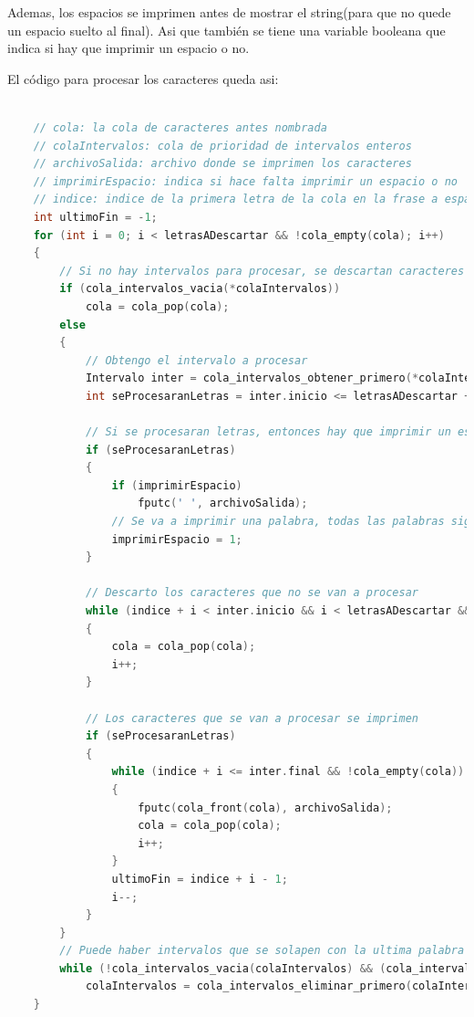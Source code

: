 \documentclass{article}
\begin{document}
Ademas, los espacios se imprimen antes de mostrar el string(para que no quede un espacio suelto al final). Asi que también se tiene una variable booleana que indica si hay que
imprimir un espacio o no.

El código para procesar los caracteres queda asi:

\begin{lstlisting}[language=C]

    // cola: la cola de caracteres antes nombrada
    // colaIntervalos: cola de prioridad de intervalos enteros
    // archivoSalida: archivo donde se imprimen los caracteres
    // imprimirEspacio: indica si hace falta imprimir un espacio o no
    // indice: indice de la primera letra de la cola en la frase a espaciar
    int ultimoFin = -1;
    for (int i = 0; i < letrasADescartar && !cola_empty(cola); i++)
    {
        // Si no hay intervalos para procesar, se descartan caracteres
        if (cola_intervalos_vacia(*colaIntervalos))
            cola = cola_pop(cola);
        else
        {
            // Obtengo el intervalo a procesar
            Intervalo inter = cola_intervalos_obtener_primero(*colaIntervalos);
            int seProcesaranLetras = inter.inicio <= letrasADescartar + indice;

            // Si se procesaran letras, entonces hay que imprimir un espacio si es necesario
            if (seProcesaranLetras)
            {
                if (imprimirEspacio)
                    fputc(' ', archivoSalida);
                // Se va a imprimir una palabra, todas las palabras siguientes tienen que tener un espacio
                imprimirEspacio = 1;
            }

            // Descarto los caracteres que no se van a procesar
            while (indice + i < inter.inicio && i < letrasADescartar && !cola_empty(cola))
            {
                cola = cola_pop(cola);
                i++;
            }

            // Los caracteres que se van a procesar se imprimen
            if (seProcesaranLetras)
            {
                while (indice + i <= inter.final && !cola_empty(cola))
                {
                    fputc(cola_front(cola), archivoSalida);
                    cola = cola_pop(cola);
                    i++;
                }
                ultimoFin = indice + i - 1;
                i--;
            }
        }
        // Puede haber intervalos que se solapen con la ultima palabra procesada, de ser asi, tienen que ser eliminados de la cola de prioridad
        while (!cola_intervalos_vacia(colaIntervalos) && (cola_intervalos_obtener_primero(colaIntervalos).inicio <= indice || ultimoFin >= cola_intervalos_obtener_primero(colaIntervalos).inicio))
            colaIntervalos = cola_intervalos_eliminar_primero(colaIntervalos);
    }
\end{lstlisting}
\end{document}
